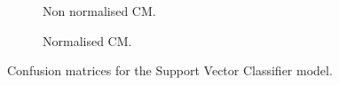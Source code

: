 \begin{figure}[ht]
    \centering
    \begin{subfigure}{.45\textwidth}
        \centering
        \captionsetup{width=0.9\linewidth}
        \captionsetup{justification=centering}
        \caption{Non normalised CM.}
    \end{subfigure}
    \hspace{1cm}
    \begin{subfigure}{.45\textwidth}
        \centering
        \captionsetup{width=0.9\linewidth}
        \captionsetup{justification=centering}
        \caption{Normalised CM.}
    \end{subfigure}
    \captionsetup{width=0.8\linewidth}
    \captionsetup{justification=centering}
    \caption{Confusion matrices for the Support Vector Classifier model.}
    \label{fig:ma_svc_cm}
\end{figure}


